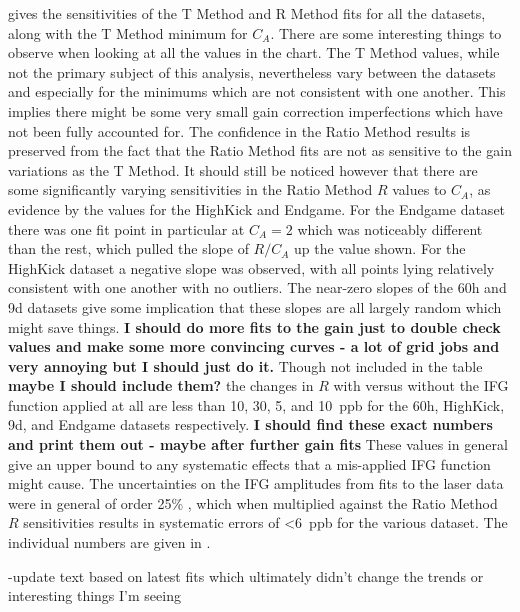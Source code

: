  gives the sensitivities of the T Method and R Method fits for all the datasets, along with the T Method minimum for $C_{A}$. There are some interesting things to observe when looking at all the values in the chart. The T Method values, while not the primary subject of this analysis, nevertheless vary between the datasets and especially for the minimums which are not consistent with one another. This implies there might be some very small gain correction imperfections which have not been fully accounted for. The confidence in the Ratio Method results is preserved from the fact that the Ratio Method fits are not as sensitive to the gain variations as the T Method. It should still be noticed however that there are some significantly varying sensitivities in the Ratio Method $R$ values to $C_{A}$, as evidence by the values for the HighKick and Endgame. For the Endgame dataset there was one fit point in particular at $C_{A} = 2$ which was noticeably different than the rest, which pulled the slope of $R/C_{A}$ up the value shown. For the HighKick dataset a negative slope was observed, with all points lying relatively consistent with one another with no outliers. The near-zero slopes of the 60h and 9d datasets give some implication that these slopes are all largely random which might save things. \textbf{I should do more fits to the gain just to double check values and make some more convincing curves - a lot of grid jobs and very annoying but I should just do it.} Though not included in the table \textbf{maybe I should include them?} the changes in $R$ with versus without the IFG function applied at all are less than \SI{10}{}, \SI{30}{}, \SI{5}{}, and \SI{10}{ppb} for the 60h, HighKick, 9d, and Endgame datasets respectively. \textbf{I should find these exact numbers and print them out - maybe after further gain fits} These values in general give an upper bound to any systematic effects that a mis-applied IFG function might cause. The uncertainties on the IFG amplitudes from fits to the laser data were in general of order 25\% \cite{AnnaPersonalComm}, which when multiplied against the Ratio Method $R$ sensitivities results in systematic errors of \SI{<6}{ppb} for the various dataset. The individual numbers are given in .


-update text based on latest fits which ultimately didn't change the trends or interesting things I'm seeing


